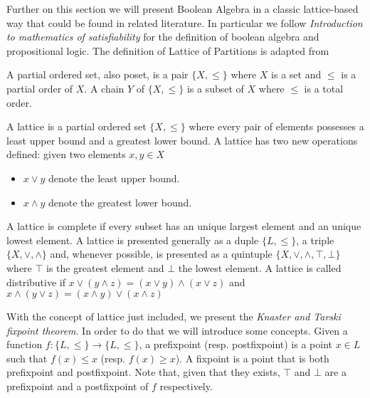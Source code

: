 Further on this section we will present Boolean Algebra in a classic lattice-based way that could be found in related literature. In particular we follow  \emph{Introduction to mathematics of satisfiability}\cite{marek2009introduction} for the definition of boolean algebra and propositional logic. The definition of Lattice of Partitions is adapted from \cite{sakallah2009symmetry}

\begin{definition}
  A partial ordered set, also poset, is a pair $\{X, \le\}$ where $X$ is a set and $\le$ is a partial order of $X$. A chain $Y$ of $\{X, \le\}$ is a subset of $X$ where $\le$ is a total order. 
\end{definition}



\begin{definition} A lattice is a partial ordered set 
$ \{X,\le\} $ where every pair of elements possesses a least upper bound and a greatest lower bound. A lattice has two new operations defined: given two elements $x,y\in X$
  \begin{itemize}
  \item $x\vee y$ denote the least upper bound.
  \item $x\wedge y$  denote the greatest lower bound.
  \end{itemize}
\end{definition}


  A lattice is complete if every subset has an unique largest element and an unique lowest element. A lattice is presented generally as a duple $\{L,\le\}$, a triple $\{X,\vee,\wedge\}$ and, whenever possible, is presented as a quintuple $\{X, \vee, \wedge, \top,\bot\}$ where $\top$ is the greatest element and $\bot$ the lowest element. A lattice is called distributive if $x\vee(y \wedge z) = (x\vee y) \wedge (x \vee z)$ and $x\wedge(y \vee z) = (x\wedge y) \vee (x \wedge z)$



With the concept of lattice just included, we present the \emph{Knaster and Tarski fixpoint theorem}. In order to do that we will introduce some concepts. Given a function $f:\{L,\le\}\to \{L,\le\}$, a prefixpoint (resp. postfixpoint) is a point $x \in L$ such that $f(x) \le x$ (resp. $f(x) \ge x$). A fixpoint is a point that is both prefixpoint and postfixpoint. Note that, given that they exists, $\top$ and $\bot$ are a prefixpoint and a postfixpoint of $f$ respectively.

